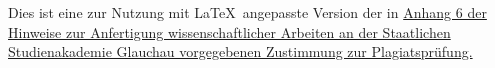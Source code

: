 \vfill

{\footnotesize Dies ist eine zur Nutzung mit \LaTeX\ angepasste Version der in \href{https://www.ba-glauchau.de/fileadmin/glauchau/waehrend-des-studium/dokumente/pruefungen/4BA-F.207_Hinweise_zur_Anfertigung_wissenschaftlicher_Arbeiten.pdf}{Anhang 6 der Hinweise zur Anfertigung wissenschaftlicher Arbeiten an der Staatlichen Studienakademie Glauchau vorgegebenen Zustimmung zur Plagiatsprüfung.}}